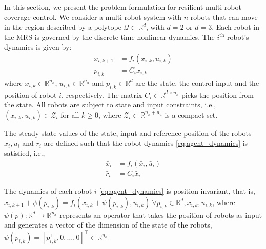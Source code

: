 In this section, we present the problem formulation for resilient multi-robot coverage control. %
We consider a multi-robot system with $n$ robots that can move in the region described by a polytope $\mathcal{Q}\subset \mathbb{R}^d$, with $d =2$ or $d = 3$. Each robot in the MRS is governed by the discrete-time nonlinear dynamics. The $i^\text{th}$ robot's dynamics is given by:
\begin{align} \label{eq:agent_dynamics}
    x_{i,k+1} &= f_{i}(x_{i,k}, u_{i,k})\\
     p_{i,k} &= C_{i}x_{i,k}
\end{align}
where  $x_{i,k} \in \mathbb{R}^{n_x}$, $u_{i,k} \in \mathbb{R}^{n_u}$ and $p_{i,k} \in \mathbb{R}^d$ are the state, the control input and the position of robot $i$, respectively. The matrix $C_i \in \mathbb{R}^{d \times n_x}$ picks the position from the state. All robots are subject to state and input constraints, i.e., $(x_{i,k},u_{i,k})  \in \mathcal{Z}_i$ for all $k\geq 0$, where $\mathcal{Z}_i \subset \mathbb{R}^{n_{x}+n_{u}}$ is a compact set.

The steady-state values of the state, input and reference position of the robots $\bar{x}_{i}, \bar{u}_{i}$ and $\bar{r}_{i}$ are defined such that the robot dynamics \eqref{eq:agent_dynamics} is satisfied, i.e.,
\begin{align} \label{eq:agent_dynamics_ss}
    \bar{x}_{i} &= f_{i}(\bar{x}_{i}, \bar{u}_{i})\\
     \bar{r}_{i} &= C_{i}\bar{x}_{i}
\end{align}

\begin{assumption}
\label{ass:invariant}
The dynamics of each robot $i$ \eqref{eq:agent_dynamics} is position invariant, that is, $x_{i,k+1} + \psi(p_{i,k}) = f_i(x_{i,k} + \psi(p_{i,k}),u_{i,k}) \ \forall p_{i,k} \in \mathbb{R}^d, x_{i,k}, u_{i,k}$, where $\psi(p): \mathbb{R}^d \rightarrow\mathbb{R}^{n_{x}}$ represents an operator that takes the position of robots as input and generates a vector of the dimension of the state of the robots, $\psi(p_{i,k}) = [p_{i,k}^\top, 0, \dots,0]^\top \in \mathbb{R}^{n_x}$.
\end{assumption}

